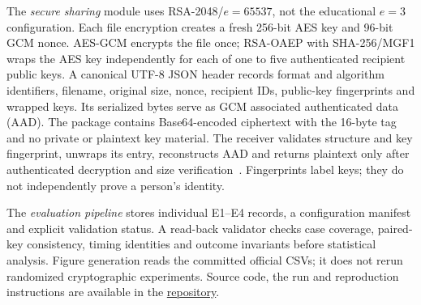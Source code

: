 The \emph{secure sharing} module uses RSA-2048/$e=65537$, not the educational $e=3$ configuration. Each file encryption creates a fresh 256-bit AES key and 96-bit GCM nonce. AES-GCM encrypts the file once; RSA-OAEP with SHA-256/MGF1 wraps the AES key independently for each of one to five authenticated recipient public keys. A canonical UTF-8 JSON header records format and algorithm identifiers, filename, original size, nonce, recipient IDs, public-key fingerprints and wrapped keys. Its serialized bytes serve as GCM associated authenticated data (AAD). The package contains Base64-encoded ciphertext with the 16-byte tag and no private or plaintext key material. The receiver validates structure and key fingerprint, unwraps its entry, reconstructs AAD and returns plaintext only after authenticated decryption and size verification~\cite{dworkin2007gcm}. Fingerprints label keys; they do not independently prove a person's identity.

The \emph{evaluation pipeline} stores individual E1--E4 records, a configuration manifest and explicit validation status. A read-back validator checks case coverage, paired-key consistency, timing identities and outcome invariants before statistical analysis. Figure generation reads the committed official CSVs; it does not rerun randomized cryptographic experiments. Source code, the run and reproduction instructions are available in the \href{https://github.com/Dung092005/Crypto-project}{repository}.
